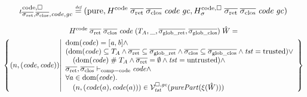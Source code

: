 \documentclass[a4paper]{article}
\begin{document}
\[
  \codereg{\sigrets,\sigcloss,\code,\gc} \defeq (\pure,
H^\mathrm{code} \; \sigrets \; \sigcloss \; \code \; \gc,
H^\mathrm{code,\square}_\sigma \; \sigrets \; \sigcloss \; \code \; \gc)
\]

\begin{multline*}
  H^\mathrm{code} \; \sigrets \; \sigcloss \; \code \; (\ta,\_,\gsigrets,\gsigcloss) \; \hat{W} =\\
  \left\{\npair{(\code,\code)} \middle|
    \begin{array}{l}
    \dom(\code) = [\aaddr,\baddr] \wedge \\
      (\dom(\code) \subseteq \ta \wedge \sigrets \subseteq \gsigrets \wedge \sigcloss \subseteq \gsigcloss \wedge \trust = \trusted) \vee \\
      \quad (\dom(\code)\mathrel{\#} \ta \wedge \sigrets = \emptyset \wedge \trust =\untrusted) \wedge \\
      \sigrets,\sigcloss \vdash_{\mathrm{comp-code}} \code \wedge\\
      \forall a \in \dom(\code)\ldotp\\
      \quad\npair{(\code(a),\code(a))} \in \lrvg{\trust}(\purePart{\xi(\hat{W})})
    \end{array}
  \right\}
\end{multline*}
\end{document}
